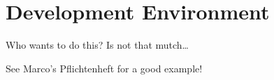 \section{Development Environment}

Who wants to do this? Is not that mutch\ldots

See Marco's Pflichtenheft for a good example!
